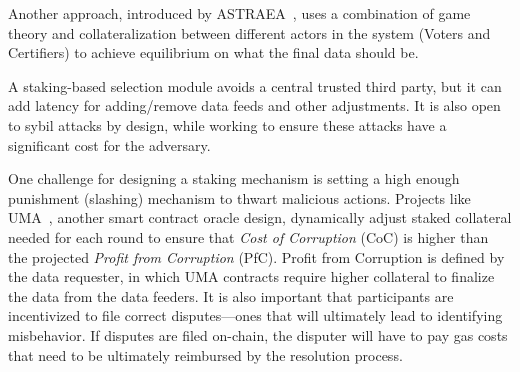 Another approach, introduced by ASTRAEA~\cite{adler2018astraea}, uses a combination of game theory and collateralization between different actors in the system (Voters and Certifiers) to achieve equilibrium on what the final data should be. 

A staking-based selection module avoids a central trusted third party, but it can add latency for adding/remove data feeds and other adjustments. It is also open to sybil attacks by design, while working to ensure these attacks have a significant cost for the adversary. 

One challenge for designing a staking mechanism is setting a high enough punishment (slashing) mechanism to thwart malicious actions. Projects like UMA~\cite{umawhitepaper}, another smart contract oracle design, dynamically adjust staked collateral needed for each round to ensure that \textit{Cost of Corruption} (CoC) is higher than the projected \textit{Profit from Corruption} (PfC). Profit from Corruption is defined by the data requester, in which UMA contracts require higher collateral to finalize the data from the data feeders. It is also important that participants are incentivized to file correct disputes---ones that will ultimately lead to identifying misbehavior. If disputes are filed on-chain, the disputer will have to pay gas costs that need to be ultimately reimbursed by the resolution process. 



